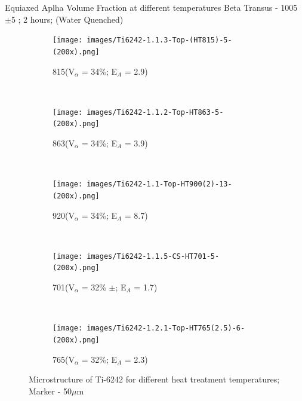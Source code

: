 \documentclass[10pt]{beamer}
\begin{document}

\begin{frame}{Equiaxed Aplha Volume Fraction at different temperatures}
Beta Transus - 1005 $\pm$5 \degC ; 2 hours; (Water Quenched)

\vspace{-5mm}

\begin{figure}[H]
    \centering
    \begin{subfigure}{0.25\textwidth}
        \texttt{[image: images/Ti6242-1.1.3-Top-(HT815)-5-(200x).png]}
        \caption{815\degC (V$_{\alpha}$ = 34\%; E$_{A}$ = 2.9)}
        \label{fig:Ti-6242 HT815}
    \end{subfigure}
    ~
    \begin{subfigure}{0.25\textwidth}
        \texttt{[image: images/Ti6242-1.1.2-Top-HT863-5-(200x).png]}
        \caption{863\degC (V$_{\alpha}$ = 34\%; E$_{A}$ = 3.9)}
        \label{fig:Ti-6242 HT863}
    \end{subfigure}
    ~
    \begin{subfigure}{0.25\textwidth}
        \texttt{[image: images/Ti6242-1.1-Top-HT900(2)-13-(200x).png]}
        \caption{920\degC (V$_{\alpha}$ = 34\%; E$_{A}$ = 8.7)}
        \label{fig:Ti-6242 HT920}
    \end{subfigure}   
    \\
    \begin{subfigure}{0.25\textwidth}
        \texttt{[image: images/Ti6242-1.1.5-CS-HT701-5-(200x).png]}
        \caption{701\degC (V$_{\alpha}$ = 32\% $\pm$; E$_{A}$ = 1.7)}
        \label{fig:Ti-6242 HT700}
    \end{subfigure}    
    ~
    \begin{subfigure}{0.25\textwidth}
        \texttt{[image: images/Ti6242-1.2.1-Top-HT765(2.5)-6-(200x).png]}
        \caption{765\degC (V$_{\alpha}$ = 32\%; E$_{A}$ = 2.3)}
        \label{fig:Ti-6242 HT752}
    \end{subfigure}      
   
    \caption{\tiny Microstructure of Ti-6242 for different heat treatment temperatures; Marker - 50$\mu$m}
    
\end{figure}
\end{frame}


\end{document}
